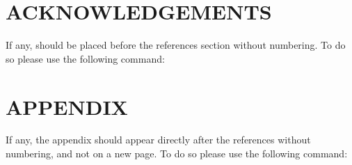 \documentclass[a4paper,twoside]{article}
\begin{document}
\section*{\uppercase{Acknowledgements}}

If any, should be placed before the references section
without numbering. To do so please use the following command:




{\small
}


\section*{\uppercase{Appendix}}

If any, the appendix should appear directly after the
references without numbering, and not on a new page. To do so please use the following command:
\end{document}
